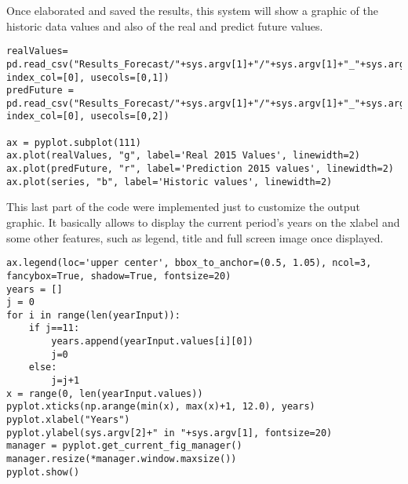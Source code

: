 Once elaborated and saved the results, this system will show a graphic of the historic data values and also of the real and predict future values.
\begin{lstlisting}
realValues= pd.read_csv("Results_Forecast/"+sys.argv[1]+"/"+sys.argv[1]+"_"+sys.argv[2]+"_futurePred.csv", index_col=[0], usecols=[0,1])
predFuture = pd.read_csv("Results_Forecast/"+sys.argv[1]+"/"+sys.argv[1]+"_"+sys.argv[2]+"_futurePred.csv", index_col=[0], usecols=[0,2])

ax = pyplot.subplot(111)
ax.plot(realValues, "g", label='Real 2015 Values', linewidth=2)
ax.plot(predFuture, "r", label='Prediction 2015 values', linewidth=2)
ax.plot(series, "b", label='Historic values', linewidth=2)

\end{lstlisting}

This last part of the code were implemented just to customize the output graphic. It basically allows to display the current period's years on the xlabel and some other features, such as legend, title and full screen image once displayed.
\begin{lstlisting}
ax.legend(loc='upper center', bbox_to_anchor=(0.5, 1.05), ncol=3, fancybox=True, shadow=True, fontsize=20)
years = []
j = 0
for i in range(len(yearInput)):
    if j==11:
        years.append(yearInput.values[i][0])
        j=0
    else:
        j=j+1 
x = range(0, len(yearInput.values))
pyplot.xticks(np.arange(min(x), max(x)+1, 12.0), years)
pyplot.xlabel("Years")
pyplot.ylabel(sys.argv[2]+" in "+sys.argv[1], fontsize=20)
manager = pyplot.get_current_fig_manager()
manager.resize(*manager.window.maxsize())
pyplot.show()
\end{lstlisting}
